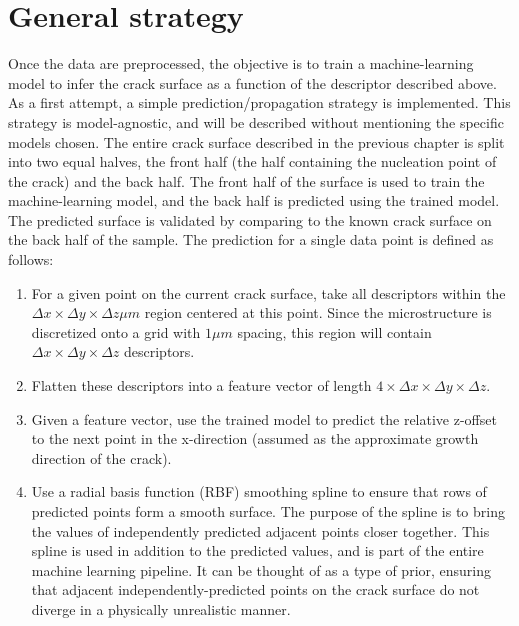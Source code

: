 \section{General strategy}
Once the data are preprocessed, the objective is to train a machine-learning model to infer the crack surface as a function of the descriptor described above.  As a first attempt, a simple prediction/propagation strategy is implemented.  This strategy is model-agnostic, and will be described without mentioning the specific models chosen.  The entire crack surface described in the previous chapter is split into two equal halves, the front half (the half containing the nucleation point of the crack) and the back half.  The front half of the surface is used to train the machine-learning model, and the back half is predicted using the trained model. The predicted surface is validated by comparing to the known crack surface on the back half of the sample.  The prediction for a single data point is defined as follows:

\begin{enumerate}
  \item For a given point on the current crack surface, take all descriptors within the $\Delta x \times \Delta y \times \Delta z \mu m$ region centered at this point.  Since the microstructure is discretized onto a grid with $1 \mu m$ spacing, this region will contain $\Delta x \times \Delta y \times \Delta z$ descriptors.
  \item Flatten these descriptors into a feature vector of length  $4 \times \Delta x \times \Delta y \times \Delta z$.
  \item Given a feature vector, use the trained model to predict the relative z-offset to the next point in the x-direction (assumed as the approximate growth direction of the crack).
  \item Use a radial basis function (RBF) smoothing spline to ensure that rows of predicted points form a smooth surface.  The purpose of the spline is to bring the values of independently predicted adjacent points closer together.  This spline is used in addition to the predicted values, and is part of the entire machine learning pipeline.  It can be thought of as a type of prior, ensuring that adjacent independently-predicted points on the crack surface do not diverge in a physically unrealistic manner.
\end{enumerate}

